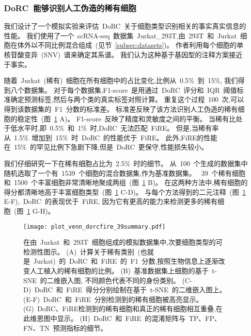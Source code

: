\subsubsection{DoRC~能够识别人工伪造的稀有细胞}
\label{subsec:recplanted} 
我们设计了一个模拟实验来评估~DoRC~关于细胞类型识别相关的事实真实信息的性能。
我们使用了一个~scRNA-seq~数据集~Jurkat\_293T,由~293T~和~Jurkat~细胞在体外以不同比例混合组成~(见节~\ref{subsec:datasets})。
作者利用每个细胞的单核苷酸变异~(SNV)~谱来确定其系谱。
我们认为这种基于基因型的注释方案接近于事实。

随着~Jurkat~(稀有)~细胞在所有细胞中的占比变化,比例从~0.5\%~到~15\%,
我们得到八个数据集。
对于每个数据集,F1-score~是用通过~DoRC~评分和~IQR~阈值标准确定预测标签,然后与两个类的真实标签对照计算。
重复这个过程~100~次,可以得到该数据集的~F1~分数的标准差。
标准差反映了该方法识别人工伪造的稀有细胞的稳定性~(图~\ref{fig:jurkat} A)。 
F1-score~反映了精度和灵敏度之间的平衡。
当稀有比处于低水平时,即~0.5\%~和~1\%~时,DoRC~无法匹配~FiRE。
但是,当稀有率从~1.5\%~增加到~15\%~时~DoRC~的性能优于~FiRE。
此外,FiRE的性能在~15\%~的罕见比例下急剧下降,但是~DoRC~更保守,性能损失较小。

我们仔细研究一下在稀有细胞占比为~2.5\%~时的细节。
从~100~个生成的数据集中随机选取了一个有~1539~个细胞的混合数据集,作为基准数据集。
~39~个稀有细胞和~1500~个丰富细胞非常清晰地聚成两组~(图~\ref{fig:jurkat} B)。
在这两种方法中,稀有细胞的得分都清晰地高于丰富细胞类型~(图~\ref{fig:jurkat} C-D)。
与每个方法得到的二元注释~(图~\ref{fig:jurkat} E-F),~DoRC~的表现优于~FiRE,
因为它有更高的能力来检测更多的稀有细胞~(图~\ref{fig:jurkat} G-H)。

\begin{figure}[!htbp]
    \centering
    \texttt{[image: plot\_venn\_dorcfire\_39summary.pdf]}
    \caption{
    在由~Jurkat~和~293T~细胞组成的模拟数据集中,次要细胞类型的可检测性图示。
    (A)~计算关于稀有类别~(也就是~Jurkat)~的~DoRC~和~FiRE~的~F1~分数,按照生物信息上逐渐改变人工植入的稀有细胞的比例。
    (B)~基准数据集上细胞的基于~t-SNE~的二维嵌入图, 不同颜色代表不同的身份类别。
    (C-D)~DoRC~和~FiRE~得分分别绘制在基于~t-SNE~的二维嵌入图上。
    (E-F)~DoRC~和~FiRE~分别检测到的稀有细胞被高亮显示。
    (G)~DoRC、FiRE检测到的稀有细胞和真正的稀有细胞相互重叠,在此维恩图中显示。
    (H)~DoRC~和~FiRE~的混淆矩阵与~TP、FP、FN、TN~预测指标的细节。
    }
    \label{fig:jurkat}
\end{figure}

